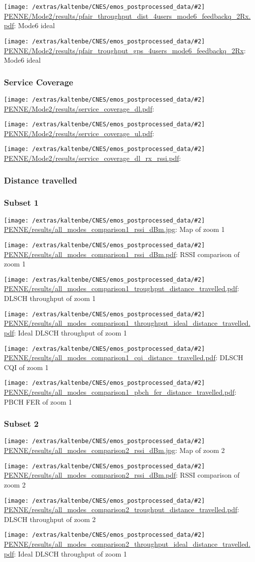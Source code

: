 \documentclass[a4paper,10pt]{article}
\newcommand{\printfile}[2][]{
 \begin{minipage}{8cm}
  \centering
  \texttt{[image: /extras/kaltenbe/CNES/emos\_postprocessed\_data/\#2]}
  \url{#2}: #1

 \end{minipage}
}
\begin{document}
\printfile[Mode6 ideal]{PENNE/Mode2/results/pfair_throughput_dist_4users_mode6_feedbackq_2Rx.pdf}
\printfile[Mode6 ideal]{PENNE/Mode2/results/pfair_troughput_gps_4users_mode6_feedbackq_2Rx}


\subsubsection{Service Coverage}

\printfile{PENNE/Mode2/results/service_coverage_dl.pdf}
\printfile{PENNE/Mode2/results/service_coverage_ul.pdf}

\printfile{PENNE/Mode2/results/service_coverage_dl_rx_rssi.pdf}

\subsubsection{Distance travelled}
\label{sec:dist_travelled_penne}

\subsubsection*{Subset 1}

\printfile[Map of zoom 1]{PENNE/results/all_modes_comparison1_rssi_dBm.jpg}
\printfile[RSSI comparison of zoom 1]{PENNE/results/all_modes_comparison1_rssi_dBm.pdf}

\printfile[DLSCH throughput of zoom 1]{PENNE/results/all_modes_comparison1_troughput_distance_travelled.pdf}
\printfile[Ideal DLSCH throughput of zoom 1]{PENNE/results/all_modes_comparison1_throughput_ideal_distance_travelled.pdf}

\printfile[DLSCH CQI of zoom 1]{PENNE/results/all_modes_comparison1_cqi_distance_travelled.pdf}
\printfile[PBCH FER of zoom 1]{PENNE/results/all_modes_comparison1_pbch_fer_distance_travelled.pdf}

\subsubsection*{Subset 2}

\printfile[Map of zoom 2]{PENNE/results/all_modes_comparison2_rssi_dBm.jpg}
\printfile[RSSI comparison of zoom 2]{PENNE/results/all_modes_comparison2_rssi_dBm.pdf}

\printfile[DLSCH throughput of zoom 2]{PENNE/results/all_modes_comparison2_troughput_distance_travelled.pdf}
\printfile[Ideal DLSCH throughput of zoom 1]{PENNE/results/all_modes_comparison2_throughput_ideal_distance_travelled.pdf}
\end{document}
